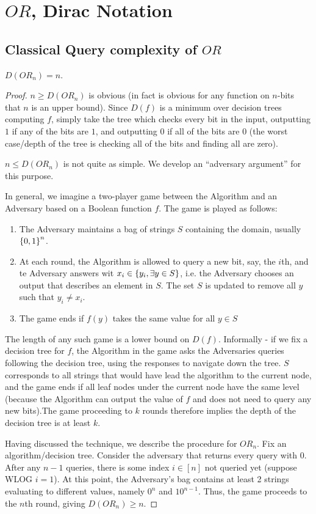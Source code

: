 \section{$OR$, Dirac Notation}

\subsection*{Classical Query complexity of $OR$}
\begin{propbox}{}
    $D(OR_n) = n$.
\end{propbox}

\begin{proof}
    $n \geq D(OR_n)$ is obvious (in fact is obvious for any function on $n$-bits that $n$ is an upper bound). Since $D(f)$ is a minimum over decision trees computing $f$, simply take the tree which checks every bit in the input, outputting $1$ if any of the bits are $1$, and outputting $0$ if all of the bits are $0$ (the worst case/depth of the tree is checking all of the bits and finding all are zero).

    $n \leq D(OR_n)$ is not quite as simple. We develop an ``adversary argument'' for this purpose. 

    In general, we imagine a two-player game between the Algorithm and an Adversary based on a Boolean function $f$. The game is played as follows:
    \begin{enumerate}
        \item The Adversary maintains a bag of strings $S$ containing the domain, usually $\set{0, 1}^n$.
        \item At each round, the Algorithm is allowed to query a new bit, say, the $i$th, and te Adversary answers wit $x_i \in \set{y_i, \exists y \in S}$, i.e. the Adversary chooses an output that describes an element in $S$. The set $S$ is updated to remove all $y$ such that $y_i \neq x_i$.
        \item The game ends if $f(y)$ takes the same value for all $y \in S$
    \end{enumerate}
    The length of any such game is a lower bound on $D(f)$. Informally - if we fix a decision tree for $f$, the Algorithm in the game asks the Adversaries queries following the decision tree, using the responses to navigate down the tree. $S$ corresponds to all strings that would have lead the algorithm to the current node, and the game ends if all leaf nodes under the current node have the same level (because the Algorithm can output the value of $f$ and does not need to query any new bits).The game proceeding to $k$ rounds therefore implies the depth of the decision tree is at least $k$.

    Having discussed the technique, we describe the procedure for $OR_n$. Fix an algorithm/decision tree. Consider the adversary that returns every query with $0$. After any $n - 1$ queries, there is some index $i \in [n]$ not queried yet (suppose WLOG $i = 1$). At this point, the Adversary's bag contains at least 2 strings evaluating to different values, namely $0^n$ and $10^{n-1}$. Thus, the game proceeds to the $n$th round, giving $D(OR_n) \geq n$.
\end{proof}

